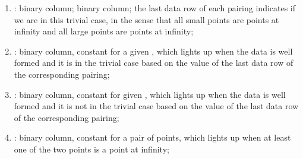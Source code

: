 \begin{enumerate}[resume]
      \item \trivialAcc: binary column; binary column; the last data row of each pairing indicates if we are in this trivial case, in the sense that all small points are points at infinity and all large points are points at infinity;
      \item \both{\wellformedDataTrivial}: binary column, constant for a given \blsId, which lights up when the data is well formed and it is in the trivial case based on the value of the last data row of the corresponding pairing;
      \item \both{\wellformedDataNonTrivial}: binary column, constant for  given \blsId, which lights up when the data is well formed and it is not in the trivial case based on the value of the last data row of the corresponding pairing;
      \item \both{\pairOfPointsContainsInfinity}: binary column, constant for a pair of points, which lights up when at least one of the two points is a point at infinity;




\end{enumerate}
